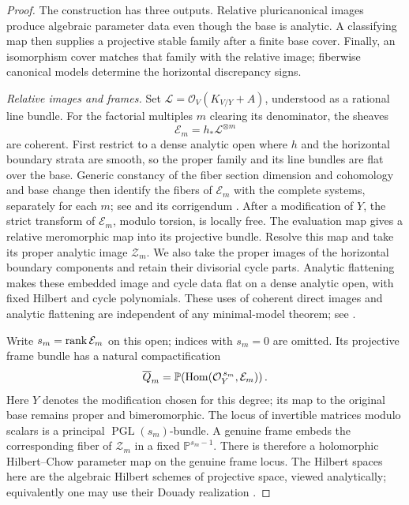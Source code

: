 \begin{proof}
The construction has three outputs.  Relative pluricanonical images
produce algebraic parameter data even though the base is analytic.
A classifying map then supplies a projective stable family after a
finite base cover.  Finally, an isomorphism cover matches that family
with the relative image; fiberwise canonical models determine the
horizontal discrepancy signs.

\emph{Relative images and frames.}
Set \(\mathcal L=\mathcal O_V(K_{V/Y}+A)\), understood as a rational
line bundle.  For the factorial multiples \(m\) clearing its denominator,
the sheaves
\[
  \mathcal E_m=h_*\mathcal L^{\otimes m}
\]
are coherent. First restrict to a dense analytic open where \(h\) and
the horizontal boundary strata are smooth, so the proper family and
its line bundles are flat over the base. Generic constancy of the
fiber section dimension and cohomology and base change then identify
the fibers of \(\mathcal E_m\) with the complete systems, separately
for each \(m\); see \cite[\S7, nos.~4--6, S\"atze~3--5]{GrauertDirectImages}
and its corrigendum \cite{GrauertDirectImagesCorr}.
After a modification of \(Y\),
the strict transform of \(\mathcal E_m\), modulo torsion, is locally free.
The evaluation map gives a relative meromorphic map into its projective
bundle.  Resolve this map and take its proper analytic image
\(\mathcal Z_m\).  We also take the proper images of the horizontal
boundary components and retain their divisorial cycle parts.
Analytic flattening makes these embedded image and cycle data flat on a
dense analytic open, with fixed Hilbert and cycle polynomials.
These uses of coherent direct images and analytic flattening are
independent of any minimal-model theorem; see \cite{HironakaFlattening}.

Write \(s_m=\operatorname{rank}\mathcal E_m\) on this open; indices with \(s_m=0\)
are omitted.  Its projective frame bundle has a natural compactification
\[
 \overline Q_m=
 \mathbb P\!\left(\operatorname{Hom}(\mathcal O_Y^{\,s_m},\mathcal E_m)\right).
\]
Here \(Y\) denotes the modification chosen for this degree; its map to
the original base remains proper and bimeromorphic.  The locus of
invertible matrices modulo scalars is a principal
\(\operatorname{PGL}(s_m)\)-bundle.
A genuine frame embeds the corresponding fiber of \(\mathcal Z_m\)
in a fixed \(\mathbb P^{s_m-1}\).  There is therefore a holomorphic
Hilbert--Chow parameter map on the genuine frame locus.
The Hilbert spaces here are the algebraic Hilbert schemes of
projective space, viewed analytically; equivalently one may use
their Douady realization \cite{Douady}.


\end{proof}
